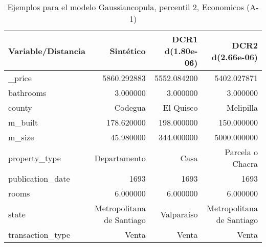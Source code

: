 \begin{table}[H]
\centering
\fontsize{10}{14}\selectfont
\caption{Ejemplos para el modelo Gaussiancopula, percentil 2, Economicos (A-1)}
\label{table-example-economicos-a-1-gaussiancopula-2p}
\begin{tabular}{|l|r|r|r|}
\hline
\rowcolor[gray]{0.8}
Variable/Distancia & Sintético & DCR1 d(1.80e-06) & DCR2 d(2.66e-06) \\
\hline \_price & \cellcolor[rgb]{0.9, 0.54, 0.52} 5860.292883 & 5552.084200 & 5402.027871 \\
\hline bathrooms & \cellcolor[rgb]{0.9, 0.54, 0.52} 3.000000 & \cellcolor[rgb]{0.9, 0.54, 0.52} 3.000000 & \cellcolor[rgb]{0.9, 0.54, 0.52} 3.000000 \\
\hline county & \cellcolor[rgb]{0.9, 0.54, 0.52} Codegua & El Quisco & Melipilla \\
\hline m\_built & \cellcolor[rgb]{0.9, 0.54, 0.52} 178.620000 & 198.000000 & 150.000000 \\
\hline m\_size & \cellcolor[rgb]{0.9, 0.54, 0.52} 45.980000 & 344.000000 & 5000.000000 \\
\hline property\_type & \cellcolor[rgb]{0.9, 0.54, 0.52} Departamento & Casa & Parcela o Chacra \\
\hline publication\_date & \cellcolor[rgb]{0.9, 0.54, 0.52} 1693 & \cellcolor[rgb]{0.9, 0.54, 0.52} 1693 & \cellcolor[rgb]{0.9, 0.54, 0.52} 1693 \\
\hline rooms & \cellcolor[rgb]{0.9, 0.54, 0.52} 6.000000 & \cellcolor[rgb]{0.9, 0.54, 0.52} 6.000000 & \cellcolor[rgb]{0.9, 0.54, 0.52} 6.000000 \\
\hline state & \cellcolor[rgb]{0.9, 0.54, 0.52} Metropolitana de Santiago & Valparaíso & \cellcolor[rgb]{0.9, 0.54, 0.52} Metropolitana de Santiago \\
\hline transaction\_type & \cellcolor[rgb]{0.9, 0.54, 0.52} Venta & \cellcolor[rgb]{0.9, 0.54, 0.52} Venta & \cellcolor[rgb]{0.9, 0.54, 0.52} Venta \\
\hline
\end{tabular}
\end{table}
